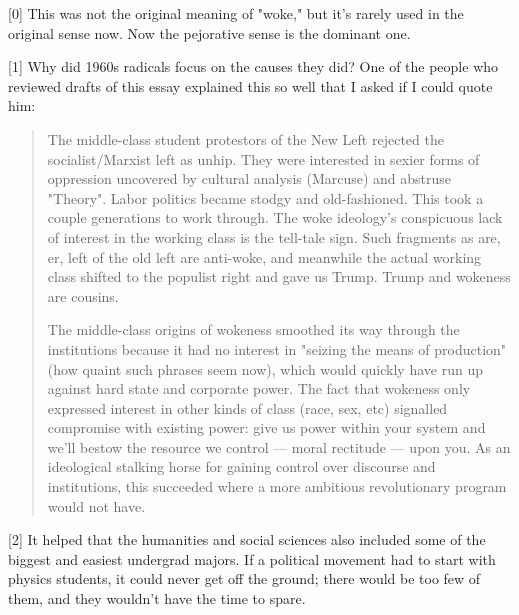 [0] This was not the original meaning of "woke," but it's
                  rarely used in the original sense now. Now the pejorative
                  sense is the dominant one.

[1] Why did 1960s radicals focus on the causes they did? One of
                  the people who reviewed drafts of this essay explained this so
                  well that I asked if I could quote him:
                  \begin{quote}

                    The middle-class student protestors of the New Left rejected
                    the socialist/Marxist left as unhip. They were interested in
                    sexier forms of oppression uncovered by cultural analysis
                    (Marcuse) and abstruse "Theory". Labor politics became
                    stodgy and old-fashioned. This took a couple generations to
                    work through. The woke ideology's conspicuous lack of
                    interest in the working class is the tell-tale sign. Such
                    fragments as are, er, left of the old left are anti-woke,
                    and meanwhile the actual working class shifted to the
                    populist right and gave us Trump. Trump and wokeness are
                    cousins.

The middle-class origins of wokeness
                    smoothed its way through the institutions because it had no
                    interest in "seizing the means of production" (how quaint
                    such phrases seem now), which would quickly have run up
                    against hard state and corporate power. The fact that
                    wokeness only expressed interest in other kinds of class
                    (race, sex, etc) signalled compromise with existing power:
                    give us power within your system and we'll bestow the
                    resource we control --- moral rectitude --- upon
                    you. As an ideological stalking horse for gaining control
                    over discourse and institutions, this succeeded where a more
                    ambitious revolutionary program would not have.
                  
\end{quote}

                  [2] It helped that the humanities and social sciences also
                  included some of the biggest and easiest undergrad majors. If
                  a political movement had to start with physics students, it
                  could never get off the ground; there would be too few of
                  them, and they wouldn't have the time to spare.

